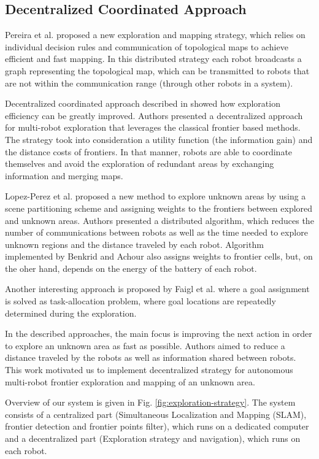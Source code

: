 \subsection{Decentralized Coordinated Approach}

Pereira et al. \cite{Pereira2015} proposed a new exploration and mapping strategy, which relies on individual decision rules and communication of topological maps to achieve efficient and fast mapping. In this distributed strategy each robot broadcasts a graph representing the topological map, which can be transmitted to robots that are not within the communication range (through other robots in a system). 

Decentralized coordinated approach described in \cite{Colares2016} showed how exploration efficiency can be greatly improved. Authors presented a decentralized approach for multi-robot exploration that leverages the classical frontier based methods. The strategy took into consideration a utility function (the information gain) and the distance costs of frontiers. In that manner, robots are able to coordinate themselves and avoid the exploration of redundant areas by exchanging information and merging maps.

Lopez-Perez et al. \cite{LopezPerez2018} proposed a new method to explore unknown areas by using a scene partitioning scheme and assigning weights to the frontiers between explored and unknown areas. Authors presented a distributed algorithm, which reduces the number of communications between robots as well as the time needed to explore unknown regions and the distance traveled by each robot. Algorithm implemented by Benkrid and Achour \cite{Benkrid2017} also assigns weights to frontier cells, but, on the oher hand, depends on the energy of the battery of each robot.

Another interesting approach is proposed by Faigl et al. \cite{Faigl2015} where a goal assignment is solved as task-allocation problem, where goal locations are repeatedly determined during the exploration. 

In the described approaches, the main focus is improving the next action in order to explore an unknown area as fast as possible. Authors aimed to reduce a distance traveled by the robots as well as information shared between robots. This work motivated us to implement decentralized strategy for autonomous multi-robot frontier exploration and mapping of an unknown area. 

Overview of our system is given in Fig. \ref{fig:exploration-strategy}. The system consists of a centralized part (Simultaneous Localization and Mapping (SLAM), frontier detection and frontier points filter), which runs on a dedicated computer and a decentralized part (Exploration strategy and navigation), which runs on each robot. 

